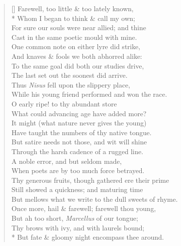 \documentclass[MAIN]{subfiles}
\begin{document}
\settowidth{\versewidth}{For sure our souls were near allied; and thine}
\begin{verse}[\versewidth]
Farewell, too little \& too lately known,\\*
Whom I began to think \& call my own;\\
For sure our souls were near allied; and thine\\
Cast in the same poetic mould with mine.\\
One common note on either lyre did strike,\\
And knaves \& fools we both abhorred alike:\\
To the same goal did both our studies drive,\\
The last set out the soonest did arrive.\\
Thus \emph{Nisus} fell upon the slippery place,\\
While his young friend performed and won the race.\\
O early ripe! to thy abundant store\\
What could advancing age have added more?\\
It might (what nature never gives the young)\\
Have taught the numbers of thy native tongue.\\
But satire needs not those, and wit will shine\\
Through the harsh cadence of a rugged line.\\
A noble error, and but seldom made,\\
When poets are by too much force betrayed.\\
Thy generous fruits, though gathered ere their prime\\
Still showed a quickness; and maturing time\\
But mellows what we write to the dull sweets of rhyme.\\
Once more, hail \& farewell; farewell thou young,\\
But ah too short, \emph{Marcellus} of our tongue;\\
Thy brows with ivy, and with laurels bound;\\*
But fate \& gloomy night encompass thee around.
\end{verse}
\end{document}
